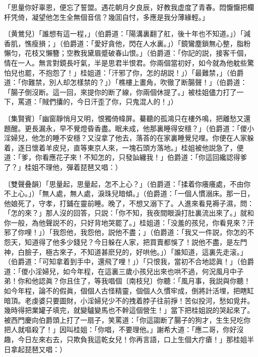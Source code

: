 \begin{myquote}
「思量你好辜恩，便忘了誓盟。遇花朝月夕良辰，好教我虚度了青春。悶懨懨把欄杆凭倚，凝望他怎生全無個音信？幾囬自忖，多應是我分薄緣輕。」

{\markfont〔黄鶯兒〕}「誰想有這一程，」{\markfont\small\color{mydarkgray}（伯爵道：「陽溝裏翻了舡，後十年也不知道。」）}「減香肌，憔瘦損；」{\markfont\small\color{mydarkgray}（伯爵道：「愛好貪他，閃在人水裏。」）}「鏡鸞塵鎖無心整，脂粉懶匀，花枝又懶簪；空教我黛眉蹙破春山恨。」{\markfont\small\color{mydarkgray}（伯爵道：「你記的説，接客千個，情在一人。無言對鏡長吁氣，半是思君半恨君。你兩個當初好，如今就為他躭些驚怕兒也罷，不抱怨了！」桂姐道：「汗邪了你，怎的胡説！」）}「最難禁，」{\markfont\small\color{mydarkgray}（伯爵道：「你難禁，別人却怎樣禁的？」）}「樵樓上畫角，吹徹了断腸聲！」{\markfont\small\color{mydarkgray}（伯爵道：「腸子倒沒断。這一回，來提你的断了線，你兩個休提了。」被桂姐儘力打了一下，罵道：「賊們攮的，今日汗歪了你，只鬼混人的！」）}

{\markfont〔集賢賓〕}「幽窗靜悄月又明，恨獨倚幃屏。驀聽的孤鴻只在樓外鳴，把離愁又還題醒。更長漏永，早不覺燈昏香盡。眠未成，他那裏睡得安穩？」{\markfont\small\color{mydarkgray}（伯爵道：「儍小淫婦兒，他怎的睡不安穩？又沒拿了他去，落荅的在家裏睡覺兒哩。你便在人家躲着，逐日懷着羊皮兒，直等東京人來，一塊石頭方落地。」桂姐被他説急了，便道：「爹，你看應花子來！不知怎的，只發訕纏我！」伯爵道：「你這回纔認得爹了？」桂姐不理他，彈着琵琶又唱：）}

{\markfont〔雙聲叠韻〕}「思量起，思量起，怎不上心？」{\markfont\small\color{mydarkgray}（伯爵道：「揉着你癢癢處，不由你不上心。」）}「無人處，無人處，淚珠兒暗傾。」{\markfont\small\color{mydarkgray}（伯爵道：「一個人慣溺床。那一日，他娘死了，守孝，打鋪在靈前睡。晚了，不想又溺下了。人進來看見褥子濕，問：「怎的來？」那人沒的回答，只説：「你不知，我夜間眼淚打肚裏流出來了。」就和你一般，為他聲説不的，只好背地哭罷了。」桂姐道：「没羞的孩兒，你看見來？汗邪了你哩！」）}「我怨他，我怨他，説他不盡；」{\markfont\small\color{mydarkgray}（伯爵道：「我又一件説，你怎的不怨天，知道得了他多少錢兒？今日躲在人家，把買賣都悞了！説他不盡，是左門神，白臉子，極古來子，不知道甚麽兒的，好哄他。」）}「誰知道，這裏先走滚。」{\markfont\small\color{mydarkgray}（伯爵道：「可知拿着到手中，還飛了哩！」）}「只恨我，當初不合地認眞！」{\markfont\small\color{mydarkgray}（伯爵道：「儍小淫婦兒，如今年程，在這裏三歲小孩兒出來也哄不過，何況風月中子弟！你和他認眞？你且住了，等我唱個〔南枝兒〕你聽：「風月事，我説與你聽！如今年程，論不的假眞，個個人古怪精靈，個個人久慣牢成，倒將計活埋，把瞎缸暗頂。老虔婆只要圖財，小淫婦兒少不的拽着脖子往前掙！苦似投河，愁如覓井。幾時得把業罐子填完，就變驢變馬也不幹這個營生！」當下把桂姐説的哭起來了。被西門慶向伯爵頭上打了一扇子，笑罵道：「你這謅断了腸子的狗才，生生兒吃你把人就嘔殺了！」因叫桂姐：「你唱，不要理他。」謝希大道：「應二哥，你好沒趣，今日左來右去，只欺負我這乾女兒！你再言語，口上生個大疔瘡！」那桂姐半日拿起琵琶又唱：）}


\end{myquote}
